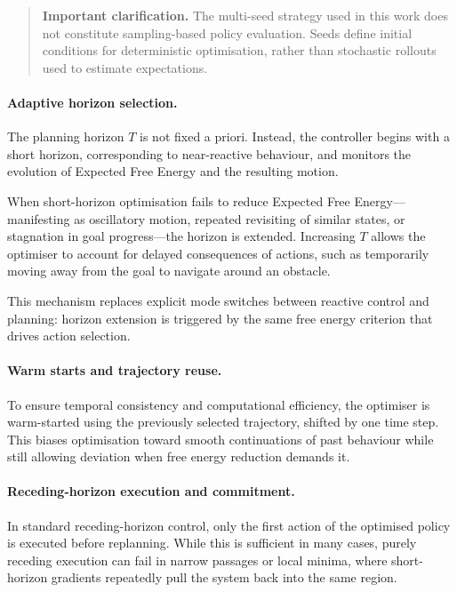 \documentclass[a4paper, twoside]{article}
\begin{document}
\begin{quote}
\textbf{Important clarification.}
The multi-seed strategy used in this work does not constitute sampling-based
policy evaluation. Seeds define initial conditions for deterministic
optimisation, rather than stochastic rollouts used to estimate expectations.
\end{quote}

\paragraph{Adaptive horizon selection.}
The planning horizon $T$ is not fixed a priori. Instead, the controller begins
with a short horizon, corresponding to near-reactive behaviour, and monitors the
evolution of Expected Free Energy and the resulting motion.

When short-horizon optimisation fails to reduce Expected Free Energy—manifesting
as oscillatory motion, repeated revisiting of similar states, or stagnation in
goal progress—the horizon is extended. Increasing $T$ allows the optimiser to
account for delayed consequences of actions, such as temporarily moving away
from the goal to navigate around an obstacle.

This mechanism replaces explicit mode switches between reactive control and
planning: horizon extension is triggered by the same free energy criterion that
drives action selection.

\paragraph{Warm starts and trajectory reuse.}
To ensure temporal consistency and computational efficiency, the optimiser is
warm-started using the previously selected trajectory, shifted by one time step.
This biases optimisation toward smooth continuations of past behaviour while
still allowing deviation when free energy reduction demands it.

\paragraph{Receding-horizon execution and commitment.}
In standard receding-horizon control, only the first action of the optimised
policy is executed before replanning. While this is sufficient in many cases,
purely receding execution can fail in narrow passages or local minima, where
short-horizon gradients repeatedly pull the system back into the same region.
\end{document}
